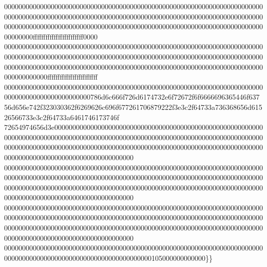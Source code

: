 00000000000000000000000000000000000000000000000000000000000000000000000000000000000000000000000000000000000000000000000000000000000000000000000000000000000000000000000000000000000000000000000000000000000000000000000000000000ffffffffffffffffffffffff0000
000000000000000000000000000000000000000000000000000000000000000000000000000000000000000000000000000000000000000000000000000000000000000000000000000000000000000000000000000000000000000000000000000000000000000000000000000000000000ffffffffffffffffffffffff
000000000000000000000000000000000000000000000000000000000000000000000000000000000000000000000000786d6c666f726d6174732e6f72672f6f6666696365446f63756d656e742f323030362f6269626c696f677261706879222f3e3c2f64733a736368656d61526566733e3c2f64733a6461746173746f
72654974656d3e0000000000000000000000000000000000000000000000000000000000000000000000000000000000000000000000000000000000000000000000000000000000000000000000000000000000000000000000000000000000000000000000000000000000000000000000000000000000000000000000
000000000000000000000000000000000000000000000000000000000000000000000000000000000000000000000000000000000000000000000000000000000000000000000000000000000000000000000000000000000000000000000000000000000000000000000000000000000000000000000000000000000000
000000000000000000000000000000000000000000000000000000000000000000000000000000000000000000000000000000000000000000000000000000000000000000000000000000000000000000000000000000000000000000000000000000000000000000000000000000000000000000000000000000000000
00000000000000000000000000000000000000000000000000000000000000000000000000000000000000000000000000000000000000000105000000000000\}\}
